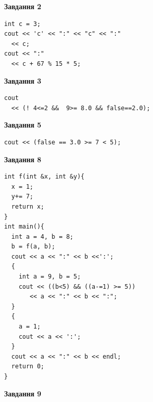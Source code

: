 \documentclass[12pt, ukrainian]{article}
\begin{document}
{\begin {large}
\begin{minipage}[t]{7.0cm}
\end{minipage}
\vline \hspace{1mm}
\begin{minipage}[t]{11.0cm}

\begin{center}
\textbf{Завдання 2}
\end{center}
\vspace{-8mm}

\begin{verbatim}
int c = 3;
cout << 'c' << ":" << "c" << ":" 
  << c;
cout << ":" 
  << c + 67 % 15 * 5;
\end{verbatim}



\begin{center}
\textbf{Завдання 3}
\end{center}
\vspace{-8mm}

\begin{verbatim}
cout 
  << (! 4<=2 &&  9>= 8.0 && false==2.0);
\end{verbatim}



\begin{center}
\textbf{Завдання 5}
\end{center}
\vspace{-8mm}

\begin{verbatim}
cout << (false == 3.0 >= 7 < 5);
\end{verbatim}



\begin{center}
\textbf{Завдання 8}
\end{center}
\vspace{-8mm}

\begin{verbatim}
int f(int &x, int &y){
  x = 1;
  y+= 7;
  return x;
}
int main(){
  int a = 4, b = 8;
  b = f(a, b);
  cout << a << ":" << b <<':';
  {
    int a = 9, b = 5;
    cout << ((b<5) && ((a-=1) >= 5))
       << a << ":" << b << ":";
  }
  {
    a = 1;
    cout << a << ':';
  }
  cout << a << ":" << b << endl;
  return 0;
}
\end{verbatim}

\end{minipage}


\begin{minipage}[t]{7.0cm}

\begin{center}
\textbf{Завдання 9}
\end{center}
\vspace{-8mm}


\end{minipage}
\end{large}}
\end{document}
